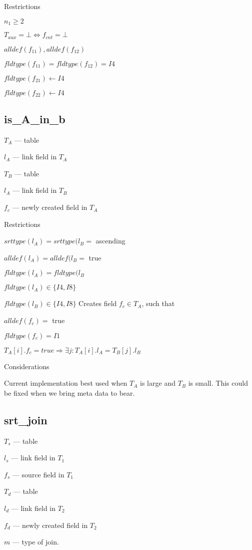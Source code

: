 Restrictions
\be
\item \(n_1 \geq 2\) 
\item \(T_{aux}  = \bot \Leftrightarrow f_{cnt} = \bot\)
\item \(alldef(f_{11}), alldef(f_{12}) \)
\item \(fldtype(f_{11}) = fldtype(f_{12}) = I4\)
\item \(fldtype(f_{21}) \leftarrow I4\)
\item \(fldtype(f_{22}) \leftarrow I4\)
\ee


\subsection{is\_A\_in\_b}
\label{is_A_in_b}

\be
\item \(T_A\) --- table
\item \(l_A\) --- link field in \(T_A\)
\item \(T_B\) --- table
\item \(l_A\) --- link field in \(T_B\)
\item \(f_c\) --- newly created field in \(T_A\)
\ee

Restrictions
\be
\item \(srttype(l_A) = srttype(l_B = \) ascending
\item \(alldef(l_A) = alldef(l_B = \) true
\item \(fldtype(l_A) = fldtype(l_B \)
\item \(fldtype(l_A) \in \{I4, I8\}\)
\item \(fldtype(l_B) \in \{I4, I8\}\)
\ee
Creates field \(f_c \in T_A\), such that 
\be
\item \(alldef(f_c) = \) true
\item \(fldtype(f_c) = I1\)
\item \(T_A[i].f_c = true \Rightarrow \exists j: T_A[i].l_A =
T_B[j].l_B\)
\ee

Considerations
\be
\item Current implementation best used when \(T_A\) is large and \(T_B\)
is small. This could be fixed when we bring meta data to bear.
\ee

\subsection{srt\_join}
\label{srt_join}

\be
\item \(T_s\) --- table
\item \(l_s\) --- link field in \(T_1\)
\item \(f_s\) --- source field in \(T_1\)
\item \(T_d\) --- table
\item \(l_d\) --- link field in \(T_2\)
\item \(f_d\) --- newly created field in \(T_2\)
\item \(m\) --- type of join. 
\ee

